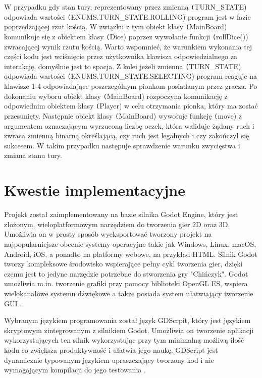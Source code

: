 \documentclass[conference]{IEEEtran}
\begin{document}
W przypadku gdy stan tury, reprezentowany przez zmienną \texttt(TURN\_STATE) odpowiada wartości \texttt(ENUMS.TURN\_STATE.ROLLING) program jest w fazie poprzedzającej rzut kością. W związku z tym obiekt klasy \texttt(MainBoard) komunikuje się z obiektem klasy \texttt(Dice) poprzez wywołanie funkcji \texttt(rollDice()) zwracającej wynik rzutu kością. Warto wspomnieć, że warunkiem wykonania tej części kodu jest wciśnięcie przez użytkownika klawisza odpowiedzialnego za interakcję, domyślnie jest to spacja. Z kolei jeżeli zmienna \texttt(TURN\_STATE) odpowiada wartości \texttt(ENUMS.TURN\_STATE.SELECTING) program reaguje na klawisze 1-4 odpowiadające poszczególnym pionkom posiadanym przez gracza. Po dokonaniu wyboru obiekt klasy \texttt(MainBoard) rozpoczyna komunikację z odpowiednim obiektem klasy \texttt(Player) w celu otrzymania pionka, który ma zostać przesunięty. Następnie obiekt klasy \texttt(MainBoard) wywołuje funkcję \texttt(move) z argumentem oznaczającym wyrzuconą liczbę oczek, która waliduje żądany ruch i zwraca zmienną binarną określającą, czy ruch jest legalnych i czy zakończył się sukcesem. W takim przypadku następuje sprawdzenie warunku zwycięstwa i zmiana stanu tury.

\section{Kwestie implementacyjne}
Projekt został zaimplementowany na bazie silnika Godot Engine, który jest złożonym, wieloplatformowym narzędziem do tworzenia gier 2D oraz 3D. Umożliwia on w prosty sposób wyeksportować tworzony projekt na najpopularniejsze obecnie systemy operacyjne takie jak Windows, Linux, macOS, Android, iOS, a ponadto na platformy webowe, na przykład HTML. Silnik Godot tworzy kompleksowe środowisko wspierające pełny cykl tworzenia gier, dzięki czemu jest to jedyne narzędzie potrzebne do stworzenia gry "Chińczyk". Godot umożliwia m.in. tworzenie grafiki przy pomocy biblioteki OpenGL ES, wspiera wielokanałowe systemu dźwiękowe a także posiada system ułatwiający tworzenie GUI \cite{godot}.\par
Wybranym językiem programowania został język GDScrpit, który jest językiem skryptowym zintegrowanym z silnikiem Godot. Umożliwia on tworzenie aplikacji wykorzystujących ten silnik wykorzystując przy tym minimalną możliwą ilość kodu co zwiększa produktywność i ułatwia jego naukę. GDScript jest dynamicznie typowanym językiem upraszczający tworzony kod i nie wymagającym kompilacji do jego testowania \cite{godot}.
\end{document}
